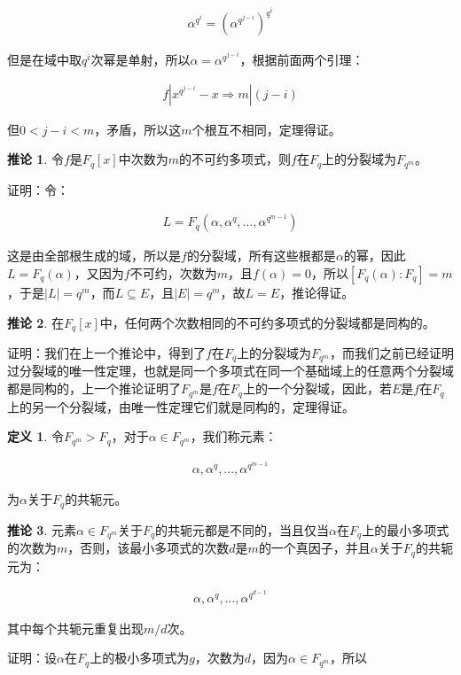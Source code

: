 \documentclass[12pt, a4paper, oneside]{ctexart}
\theoremstyle{definition}
\newtheorem*{definition}{定义}
\newtheorem*{corollary}{推论}
\begin{document}
\begin{align*}
\alpha^{q^i}=(\alpha^{q^{j-i}})^{q^i}
\end{align*}

但是在域中取$q^i$次幂是单射，所以$\alpha=\alpha^{q^{j-i}}$，根据前面两个引理：

\begin{align*}
f|x^{q^{j-i}}-x\Rightarrow m|(j-i)
\end{align*}

但$0<j-i<m$，矛盾，所以这$m$个根互不相同，定理得证。

\begin{corollary}
令$f$是$F_q[x]$中次数为$m$的不可约多项式，则$f$在$F_q$上的分裂域为$F_{q^m}$。
\end{corollary}

证明：令：

\begin{align*}
L=F_q(\alpha,\alpha^q,...,\alpha^{q^{m-1}})
\end{align*}

这是由全部根生成的域，所以是$f$的分裂域，所有这些根都是$\alpha$的幂，因此$L=F_q(\alpha)$，又因为$f$不可约，次数为$m$，且$f(\alpha)=0$，所以$[F_q(\alpha):F_q]=m$，于是$|L|=q^m$，而$L\subseteq E$，且$|E|=q^m$，故$L=E$，推论得证。

\begin{corollary}
在$F_q[x]$中，任何两个次数相同的不可约多项式的分裂域都是同构的。
\end{corollary}

证明：我们在上一个推论中，得到了$f$在$F_q$上的分裂域为$F_{q^m}$，而我们之前已经证明过分裂域的唯一性定理，也就是同一个多项式在同一个基础域上的任意两个分裂域都是同构的，上一个推论证明了$F_{q^m}$是$f$在$F_q$上的一个分裂域，因此，若$E$是$f$在$F_q$上的另一个分裂域，由唯一性定理它们就是同构的，定理得证。

\begin{definition}
令$F_{q^m}>F_q$，对于$\alpha \in F_{q^m}$，我们称元素：

\begin{align*}
\alpha,\alpha^q,...,\alpha^{q^{m-1}}
\end{align*}

为$\alpha$关于$F_q$的共轭元。
\end{definition}

\begin{corollary}
元素$\alpha\in F_{q^m}$关于$F_q$的共轭元都是不同的，当且仅当$\alpha$在$F_q$上的最小多项式的次数为$m$，否则，该最小多项式的次数$d$是$m$的一个真因子，并且$\alpha$关于$F_q$的共轭元为：

\begin{align*}
\alpha,\alpha^q,...,\alpha^{q^{d-1}}
\end{align*}

其中每个共轭元重复出现$m/d$次。

证明：设$\alpha$在$F_q$上的极小多项式为$g$，次数为$d$，因为$\alpha\in F_{q^m}$，所以
\end{corollary}
\end{document}
